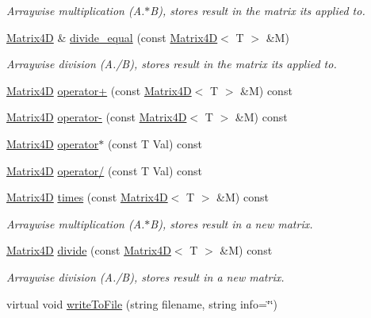 \begin{DoxyCompactItemize}
\begin{DoxyCompactList}\small\item\em Arraywise multiplication (A.$\ast$\+B), stores result in the matrix it\textquotesingle{}s applied to. \end{DoxyCompactList}\item 
\hyperlink{class_matrix4_d}{Matrix4\+D} \& \hyperlink{class_matrix4_d_aedfcd6e4f4672f9b4a313f0b5c2d8b27}{divide\+\_\+equal} (const \hyperlink{class_matrix4_d}{Matrix4\+D}$<$ T $>$ \&M)
\begin{DoxyCompactList}\small\item\em Arraywise division (A./\+B), stores result in the matrix it\textquotesingle{}s applied to. \end{DoxyCompactList}\item 
\hyperlink{class_matrix4_d}{Matrix4\+D} \hyperlink{class_matrix4_d_aeab56cc66087eeb25fe7d9a731d2a89b}{operator+} (const \hyperlink{class_matrix4_d}{Matrix4\+D}$<$ T $>$ \&M) const 
\item 
\hyperlink{class_matrix4_d}{Matrix4\+D} \hyperlink{class_matrix4_d_acca77985b70ac893e4f34687e5b43aa7}{operator-\/} (const \hyperlink{class_matrix4_d}{Matrix4\+D}$<$ T $>$ \&M) const 
\item 
\hyperlink{class_matrix4_d}{Matrix4\+D} \hyperlink{class_matrix4_d_a0559f3887f361e30a08eb34307b28f68}{operator$\ast$} (const T Val) const 
\item 
\hyperlink{class_matrix4_d}{Matrix4\+D} \hyperlink{class_matrix4_d_ac6a1d68278dae9a1c959400ee7f330a0}{operator/} (const T Val) const 
\item 
\hyperlink{class_matrix4_d}{Matrix4\+D} \hyperlink{class_matrix4_d_a7c4b56f0c611564955f74e975e5e0548}{times} (const \hyperlink{class_matrix4_d}{Matrix4\+D}$<$ T $>$ \&M) const 
\begin{DoxyCompactList}\small\item\em Arraywise multiplication (A.$\ast$\+B), stores result in a new matrix. \end{DoxyCompactList}\item 
\hyperlink{class_matrix4_d}{Matrix4\+D} \hyperlink{class_matrix4_d_a8ae451e518544537360f67d6c07a37a6}{divide} (const \hyperlink{class_matrix4_d}{Matrix4\+D}$<$ T $>$ \&M) const 
\begin{DoxyCompactList}\small\item\em Arraywise division (A./\+B), stores result in a new matrix. \end{DoxyCompactList}\item 
virtual void \hyperlink{class_matrix4_d_aa28c986248dd73ef541620cee0324cd5}{write\+To\+File} (string filename, string info=\char`\"{}\char`\"{})

\end{DoxyCompactItemize}

